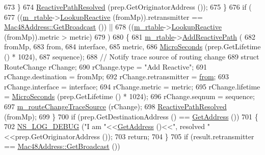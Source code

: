 \begin{DoxyCode}
673         \}
674       \hyperlink{classns3_1_1dot11s_1_1HwmpProtocol_ac9ee2097883725cf40dd05537e12a9eb}{ReactivePathResolved} (prep.GetOriginatorAddress ());
675     \}
676   \textcolor{keywordflow}{if} (
677     ((\hyperlink{classns3_1_1dot11s_1_1HwmpProtocol_a12fda0e3e5a400888c8ba1a87c1a7216}{m\_rtable}->\hyperlink{classns3_1_1dot11s_1_1HwmpRtable_a41a44ed94c1ed4d798f3278ba8db0f1f}{LookupReactive} (fromMp)).retransmitter == 
      \hyperlink{classns3_1_1Mac48Address_a55156e302c6bf950c0b558365adbde84}{Mac48Address::GetBroadcast} ()) ||
678     ((\hyperlink{classns3_1_1dot11s_1_1HwmpProtocol_a12fda0e3e5a400888c8ba1a87c1a7216}{m\_rtable}->\hyperlink{classns3_1_1dot11s_1_1HwmpRtable_a41a44ed94c1ed4d798f3278ba8db0f1f}{LookupReactive} (fromMp)).metric > metric)
679     )
680     \{
681       \hyperlink{classns3_1_1dot11s_1_1HwmpProtocol_a12fda0e3e5a400888c8ba1a87c1a7216}{m\_rtable}->\hyperlink{classns3_1_1dot11s_1_1HwmpRtable_af764d62637a7c567706f4fa0cc09c51d}{AddReactivePath} (
682         fromMp,
683         from,
684         interface,
685         metric,
686         \hyperlink{group__timecivil_ga17465a639c8d1464e76538afdd78a9f0}{MicroSeconds} (prep.GetLifetime () * 1024),
687         sequence);
688       \textcolor{comment}{// Notify trace source of routing change}
689       \textcolor{keyword}{struct }RouteChange rChange;
690       rChange.type = \textcolor{stringliteral}{"Add Reactive"};
691       rChange.destination = fromMp;
692       rChange.retransmitter = \hyperlink{lte__amc_8m_a1b4c81ff74eb1a626b5ade44c81004b3}{from};
693       rChange.interface = interface;
694       rChange.metric = metric;
695       rChange.lifetime = \hyperlink{group__timecivil_ga17465a639c8d1464e76538afdd78a9f0}{MicroSeconds} (prep.GetLifetime () * 1024);
696       rChange.seqnum = sequence;
697       \hyperlink{classns3_1_1dot11s_1_1HwmpProtocol_aff5ca87b57430809a6b6ee25fa526948}{m\_routeChangeTraceSource} (rChange);
698       \hyperlink{classns3_1_1dot11s_1_1HwmpProtocol_ac9ee2097883725cf40dd05537e12a9eb}{ReactivePathResolved} (fromMp);
699     \}
700   \textcolor{keywordflow}{if} (prep.GetDestinationAddress () == \hyperlink{classns3_1_1dot11s_1_1HwmpProtocol_ab8b2c6d98ae278406f543e25feca8ccc}{GetAddress} ())
701     \{
702       \hyperlink{group__logging_ga413f1886406d49f59a6a0a89b77b4d0a}{NS\_LOG\_DEBUG} (\textcolor{stringliteral}{"I am "}<<\hyperlink{classns3_1_1dot11s_1_1HwmpProtocol_ab8b2c6d98ae278406f543e25feca8ccc}{GetAddress} ()<<\textcolor{stringliteral}{", resolved "}<<prep.GetOriginatorAddress 
      ());
703       \textcolor{keywordflow}{return};
704     \}
705   \textcolor{keywordflow}{if} (result.retransmitter == \hyperlink{classns3_1_1Mac48Address_a55156e302c6bf950c0b558365adbde84}{Mac48Address::GetBroadcast} ())

\end{DoxyCode}
